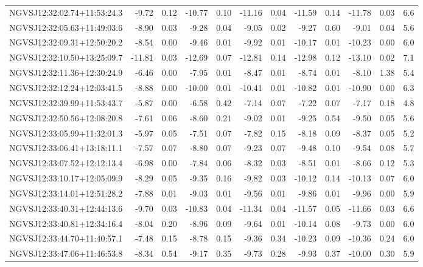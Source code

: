 \begin{tabular}{lrrrrrrrrrrc}
NGVSJ12:32:02.74+11:53:24.3 & -9.72 & 0.12 & -10.77 & 0.10 & -11.16 & 0.04 & -11.59 & 0.14 & -11.78 & 0.03 & 6.6 \\
NGVSJ12:32:05.63+11:49:03.6 & -8.90 & 0.03 & -9.28 & 0.04 & -9.05 & 0.02 & -9.27 & 0.60 & -9.01 & 0.04 & 5.6 \\
NGVSJ12:32:09.31+12:50:20.2 & -8.54 & 0.00 & -9.46 & 0.01 & -9.92 & 0.01 & -10.17 & 0.01 & -10.23 & 0.00 & 6.0 \\
NGVSJ12:32:10.50+13:25:09.7 & -11.81 & 0.03 & -12.69 & 0.07 & -12.81 & 0.14 & -12.98 & 0.12 & -13.10 & 0.02 & 7.1 \\
NGVSJ12:32:11.36+12:30:24.9 & -6.46 & 0.00 & -7.95 & 0.01 & -8.47 & 0.01 & -8.74 & 0.01 & -8.10 & 1.38 & 5.4 \\
NGVSJ12:32:12.24+12:03:41.5 & -8.88 & 0.00 & -10.00 & 0.01 & -10.41 & 0.01 & -10.82 & 0.01 & -10.90 & 0.00 & 6.3 \\
NGVSJ12:32:39.99+11:53:43.7 & -5.87 & 0.00 & -6.58 & 0.42 & -7.14 & 0.07 & -7.22 & 0.07 & -7.17 & 0.18 & 4.8 \\
NGVSJ12:32:50.56+12:08:20.8 & -7.61 & 0.06 & -8.60 & 0.21 & -9.02 & 0.01 & -9.25 & 0.54 & -9.50 & 0.05 & 5.6 \\
NGVSJ12:33:05.99+11:32:01.3 & -5.97 & 0.05 & -7.51 & 0.07 & -7.82 & 0.15 & -8.18 & 0.09 & -8.37 & 0.05 & 5.2 \\
NGVSJ12:33:06.41+13:18:11.1 & -7.57 & 0.07 & -8.80 & 0.07 & -9.23 & 0.07 & -9.48 & 0.10 & -9.54 & 0.08 & 5.7 \\
NGVSJ12:33:07.52+12:12:13.4 & -6.98 & 0.00 & -7.84 & 0.06 & -8.32 & 0.03 & -8.51 & 0.01 & -8.66 & 0.12 & 5.3 \\
NGVSJ12:33:10.17+12:05:09.9 & -8.29 & 0.05 & -9.35 & 0.16 & -9.82 & 0.03 & -10.12 & 0.14 & -10.13 & 0.07 & 6.0 \\
NGVSJ12:33:14.01+12:51:28.2 & -7.88 & 0.01 & -9.03 & 0.01 & -9.56 & 0.01 & -9.86 & 0.01 & -9.96 & 0.00 & 5.9 \\
NGVSJ12:33:40.31+12:44:13.6 & -9.70 & 0.03 & -10.83 & 0.04 & -11.34 & 0.04 & -11.57 & 0.05 & -11.66 & 0.03 & 6.6 \\
NGVSJ12:33:40.81+12:34:16.4 & -8.04 & 0.20 & -8.96 & 0.09 & -9.64 & 0.01 & -10.14 & 0.08 & -9.73 & 0.00 & 6.0 \\
NGVSJ12:33:44.70+11:40:57.1 & -7.48 & 0.15 & -8.78 & 0.15 & -9.36 & 0.34 & -10.23 & 0.09 & -10.36 & 0.24 & 6.0 \\
NGVSJ12:33:47.06+11:46:53.8 & -8.34 & 0.54 & -9.17 & 0.35 & -9.73 & 0.28 & -9.93 & 0.37 & -10.00 & 0.30 & 5.9 \\

\end{tabular}
